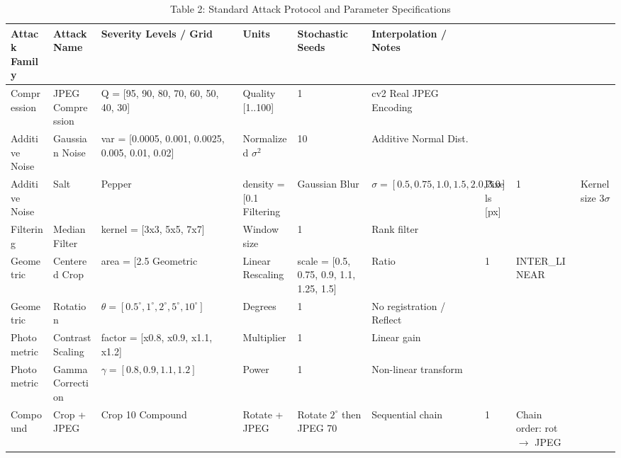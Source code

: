 \begin{table}[htbp]
\centering
\caption{Table 2: Standard Attack Protocol and Parameter Specifications}
\begin{tabular}{llllll}
\toprule
Attack Family & Attack Name & Severity Levels / Grid & Units & Stochastic Seeds & Interpolation / Notes \\
\midrule
Compression & JPEG Compression & Q = [95, 90, 80, 70, 60, 50, 40, 30] & Quality [1..100] & 1 & cv2 Real JPEG Encoding \\
Additive Noise & Gaussian Noise & var = [0.0005, 0.001, 0.0025, 0.005, 0.01, 0.02] & Normalized $\sigma^2$ & 10 & Additive Normal Dist. \\
Additive Noise & Salt & Pepper & density = [0.1%
Filtering & Gaussian Blur & $\sigma = [0.5, 0.75, 1.0, 1.5, 2.0, 3.0]$ & Pixels [px] & 1 & Kernel size $3\sigma$ \\
Filtering & Median Filter & kernel = [3x3, 5x5, 7x7] & Window size & 1 & Rank filter \\
Geometric & Centered Crop & area = [2.5%
Geometric & Linear Rescaling & scale = [0.5, 0.75, 0.9, 1.1, 1.25, 1.5] & Ratio & 1 & INTER\_LINEAR \\
Geometric & Rotation & $\theta = [0.5^\circ, 1^\circ, 2^\circ, 5^\circ, 10^\circ]$ & Degrees & 1 & No registration / Reflect \\
Photometric & Contrast Scaling & factor = [x0.8, x0.9, x1.1, x1.2] & Multiplier & 1 & Linear gain \\
Photometric & Gamma Correction & $\gamma = [0.8, 0.9, 1.1, 1.2]$ & Power & 1 & Non-linear transform \\
Compound & Crop + JPEG & Crop 10%
Compound & Rotate + JPEG & Rotate $2^\circ$ then JPEG 70 & Sequential chain & 1 & Chain order: rot $\to$ JPEG \\
\bottomrule
\end{tabular}
\end{table}
